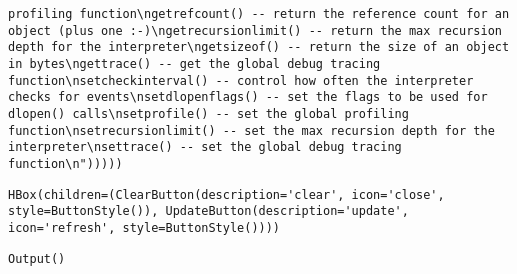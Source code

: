 \documentclass[11pt]{article}
\begin{document}
\begin{verbatim}
profiling function\ngetrefcount() -- return the reference count for an object (plus one :-)\ngetrecursionlimit() -- return the max recursion depth for the interpreter\ngetsizeof() -- return the size of an object in bytes\ngettrace() -- get the global debug tracing function\nsetcheckinterval() -- control how often the interpreter checks for events\nsetdlopenflags() -- set the flags to be used for dlopen() calls\nsetprofile() -- set the global profiling function\nsetrecursionlimit() -- set the max recursion depth for the interpreter\nsettrace() -- set the global debug tracing function\n")))))
    \end{verbatim}

    
    
    \begin{verbatim}
HBox(children=(ClearButton(description='clear', icon='close', style=ButtonStyle()), UpdateButton(description='update', icon='refresh', style=ButtonStyle())))
    \end{verbatim}

    
    
    \begin{verbatim}
Output()
    \end{verbatim}

    
    
\end{document}
